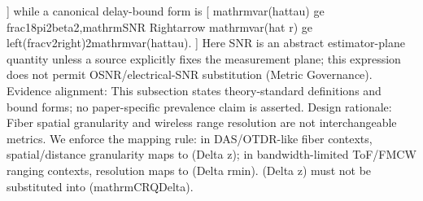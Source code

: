 {}]\markdownRendererSoftLineBreak
{}while a canonical delay-bound form is\markdownRendererSoftLineBreak
{}[\markdownRendererSoftLineBreak
{}\markdownRendererBackslash{}mathrm\markdownRendererLeftBrace{}var\markdownRendererRightBrace{}(\markdownRendererBackslash{}hat\markdownRendererBackslash{}tau) \markdownRendererBackslash{}ge \markdownRendererBackslash{}frac\markdownRendererLeftBrace{}1\markdownRendererRightBrace{}\markdownRendererLeftBrace{}8\markdownRendererBackslash{}pi\markdownRendererCircumflex{}2\markdownRendererBackslash{}beta\markdownRendererCircumflex{}2,\markdownRendererBackslash{}mathrm\markdownRendererLeftBrace{}SNR\markdownRendererRightBrace{}\markdownRendererRightBrace{} \markdownRendererBackslash{}Rightarrow \markdownRendererBackslash{}mathrm\markdownRendererLeftBrace{}var\markdownRendererRightBrace{}(\markdownRendererBackslash{}hat r) \markdownRendererBackslash{}ge \markdownRendererBackslash{}left(\markdownRendererBackslash{}frac\markdownRendererLeftBrace{}v\markdownRendererRightBrace{}\markdownRendererLeftBrace{}2\markdownRendererRightBrace{}\markdownRendererBackslash{}right)\markdownRendererCircumflex{}2\markdownRendererBackslash{}mathrm\markdownRendererLeftBrace{}var\markdownRendererRightBrace{}(\markdownRendererBackslash{}hat\markdownRendererBackslash{}tau).\markdownRendererSoftLineBreak
{}]\markdownRendererSoftLineBreak
{}Here SNR is an abstract estimator-plane quantity unless a source explicitly fixes the measurement plane; this expression does not permit OSNR/electrical-SNR substitution (Metric Governance).\markdownRendererParagraphSeparator
{}Evidence alignment: This subsection states theory-standard definitions and bound forms; no paper-specific prevalence claim is asserted.\markdownRendererInterblockSeparator
{}
\markdownRendererSectionEnd \markdownRendererSectionBegin
{}\markdownRendererInterblockSeparator
{}Design rationale: Fiber spatial granularity and wireless range resolution are not interchangeable metrics.\markdownRendererParagraphSeparator
{}We enforce the mapping rule: in DAS/OTDR-like fiber contexts, spatial/distance granularity maps to (\markdownRendererBackslash{}Delta z); in bandwidth-limited ToF/FMCW ranging contexts, resolution maps to (\markdownRendererBackslash{}Delta r\markdownRendererUnderscore{}\markdownRendererLeftBrace{}\markdownRendererBackslash{}min\markdownRendererRightBrace{}).  (\markdownRendererBackslash{}Delta z) must not be substituted into (\markdownRendererBackslash{}mathrm\markdownRendererLeftBrace{}CRQ\markdownRendererRightBrace{}\markdownRendererUnderscore{}\markdownRendererLeftBrace{}\markdownRendererBackslash{}Delta\markdownRendererRightBrace{}).\markdownRendererParagraphSeparator
